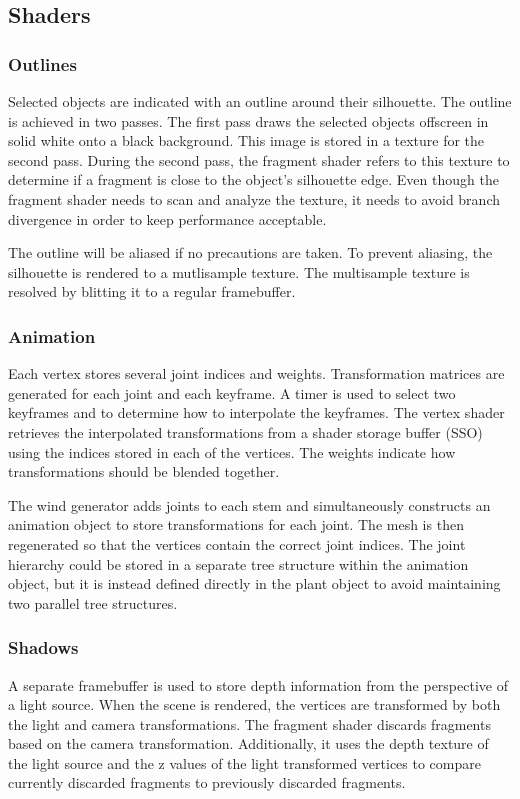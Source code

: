 \documentclass[10pt]{article}
\begin{document}
\subsection{Shaders}
\subsubsection{Outlines}
Selected objects are indicated with an outline around their silhouette. The outline is achieved in two passes. The first pass draws the selected objects offscreen in solid white onto a black background. This image is stored in a texture for the second pass. During the second pass, the fragment shader refers to this texture to determine if a fragment is close to the object's silhouette edge. Even though the fragment shader needs to scan and analyze the texture, it needs to avoid branch divergence in order to keep performance acceptable.

The outline will be aliased if no precautions are taken. To prevent aliasing, the silhouette is rendered to a mutlisample texture. The multisample texture is resolved by blitting it to a regular framebuffer.

\subsubsection{Animation}

Each vertex stores several joint indices and weights. Transformation matrices are generated for each joint and each keyframe. A timer is used to select two keyframes and to determine how to interpolate the keyframes. The vertex shader retrieves the interpolated transformations from a shader storage buffer (SSO) using the indices stored in each of the vertices. The weights indicate how transformations should be blended together.

The wind generator adds joints to each stem and simultaneously constructs an animation object to store transformations for each joint. The mesh is then regenerated so that the vertices contain the correct joint indices. The joint hierarchy could be stored in a separate tree structure within the animation object, but it is instead defined directly in the plant object to avoid maintaining two parallel tree structures.

\subsubsection{Shadows}

A separate framebuffer is used to store depth information from the perspective of a light source. When the scene is rendered, the vertices are transformed by both the light and camera transformations. The fragment shader discards fragments based on the camera transformation. Additionally, it uses the depth texture of the light source and the z values of the light transformed vertices to compare currently discarded fragments to previously discarded fragments.
\end{document}
